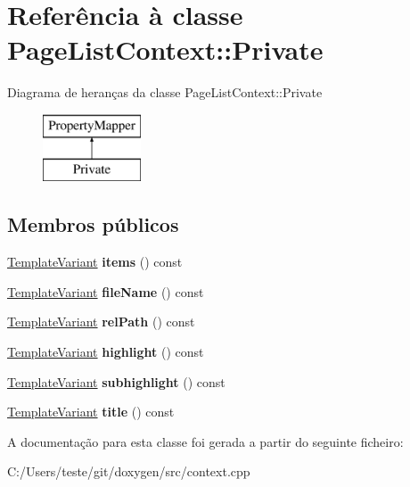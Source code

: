 \hypertarget{class_page_list_context_1_1_private}{\section{Referência à classe Page\-List\-Context\-:\-:Private}
\label{class_page_list_context_1_1_private}
}
Diagrama de heranças da classe Page\-List\-Context\-:\-:Private\begin{figure}[H]
\begin{center}
\leavevmode
\includegraphics[height=2.000000cm]{class_page_list_context_1_1_private}
\end{center}
\end{figure}
\subsection*{Membros públicos}
\begin{DoxyCompactItemize}
\item 
\hypertarget{class_page_list_context_1_1_private_a2ea6fc3c0bd7ec3bc5247c1032ff03b7}{\hyperlink{class_template_variant}{Template\-Variant} {\bfseries items} () const }\label{class_page_list_context_1_1_private_a2ea6fc3c0bd7ec3bc5247c1032ff03b7}

\item 
\hypertarget{class_page_list_context_1_1_private_ae9e01c2e41d8bdd7446faf2a1ab28a44}{\hyperlink{class_template_variant}{Template\-Variant} {\bfseries file\-Name} () const }\label{class_page_list_context_1_1_private_ae9e01c2e41d8bdd7446faf2a1ab28a44}

\item 
\hypertarget{class_page_list_context_1_1_private_a68d3623b40481f2d31009257086699e4}{\hyperlink{class_template_variant}{Template\-Variant} {\bfseries rel\-Path} () const }\label{class_page_list_context_1_1_private_a68d3623b40481f2d31009257086699e4}

\item 
\hypertarget{class_page_list_context_1_1_private_ab088f4d955499ca1d67c286a117e5bfe}{\hyperlink{class_template_variant}{Template\-Variant} {\bfseries highlight} () const }\label{class_page_list_context_1_1_private_ab088f4d955499ca1d67c286a117e5bfe}

\item 
\hypertarget{class_page_list_context_1_1_private_ade53cb2b5272274e0736e78a27b75c5b}{\hyperlink{class_template_variant}{Template\-Variant} {\bfseries subhighlight} () const }\label{class_page_list_context_1_1_private_ade53cb2b5272274e0736e78a27b75c5b}

\item 
\hypertarget{class_page_list_context_1_1_private_a5732df72750a31555da8a10f5788ef02}{\hyperlink{class_template_variant}{Template\-Variant} {\bfseries title} () const }\label{class_page_list_context_1_1_private_a5732df72750a31555da8a10f5788ef02}

\end{DoxyCompactItemize}


A documentação para esta classe foi gerada a partir do seguinte ficheiro\-:\begin{DoxyCompactItemize}
\item 
C\-:/\-Users/teste/git/doxygen/src/context.\-cpp\end{DoxyCompactItemize}
